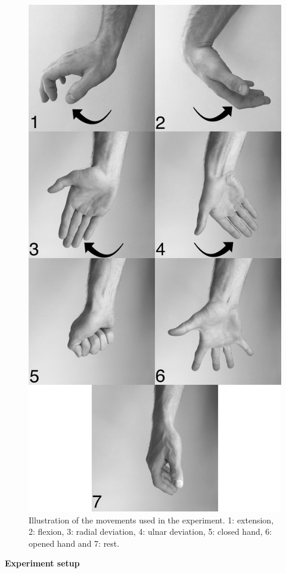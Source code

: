\begin{figure}[H]                 
	\includegraphics[width=.6\textwidth]{figures/handGestures/BW/allHandMovementsVerticalBW}  
	\caption{Illustration of the movements used in the experiment. 1: extension, 2: flexion, 3: radial deviation, 4: ulnar deviation, 5: closed hand, 6: opened hand and 7: rest.}
	\label{fig:experiment_movements} 
\end{figure}

\newpage
\textbf{\Large Experiment setup}


